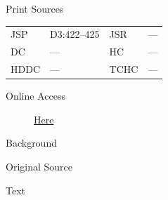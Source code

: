 			\begin{description}
					\item[Print Sources]
				\end{description}

					\begin{tabular}{p{0.5in}p{1in}p{0.5in}p{1in}}
					JSP	 	& D3:422--425		& JSR 		& --- \\
					DC	 	& --- 		& HC 		& --- \\
					HDDC 	& ---		& TCHC 		& --- \\
					\end{tabular}
				
				\begin{description}
					\item[Online Access] \href{https://www.josephsmithpapers.org/paper-summary/letter-to-j-g-fosdick-3-february-1834/1}{Here}
				\end{description}
				
				\begin{description}
					\item[Background]
				\end{description}
				
				
				\begin{description}
					\item[Original Source]
				\end{description}
				
				
				\begin{description}
					\item[Text]
				\end{description}
				
